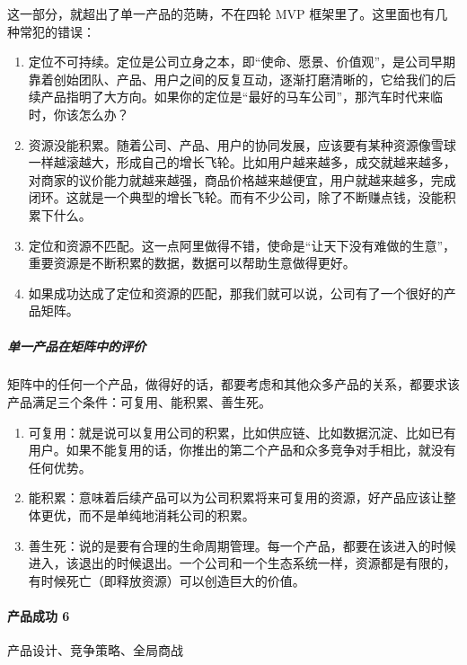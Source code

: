 \documentclass[letterpaper,11pt,english]{sphinxmanual}
\begin{document}
这一部分，就超出了单一产品的范畴，不在四轮 MVP
框架里了。这里面也有几种常犯的错误：
\begin{enumerate}
%
\item {} 
定位不可持续。定位是公司立身之本，即“使命、愿景、价值观”，是公司早期靠着创始团队、产品、用户之间的反复互动，逐渐打磨清晰的，它给我们的后续产品指明了大方向。如果你的定位是“最好的马车公司”，那汽车时代来临时，你该怎么办？

\item {} 
资源没能积累。随着公司、产品、用户的协同发展，应该要有某种资源像雪球一样越滚越大，形成自己的增长飞轮。比如用户越来越多，成交就越来越多，对商家的议价能力就越来越强，商品价格越来越便宜，用户就越来越多，完成闭环。这就是一个典型的增长飞轮。而有不少公司，除了不断赚点钱，没能积累下什么。

\item {} 
定位和资源不匹配。这一点阿里做得不错，使命是“让天下没有难做的生意”，重要资源是不断积累的数据，数据可以帮助生意做得更好。

\item {} 
如果成功达成了定位和资源的匹配，那我们就可以说，公司有了一个很好的产品矩阵。

\end{enumerate}


\subparagraph{单一产品在矩阵中的评价}
\label{\detokenize{chapter_introduction/Product:id42}}
矩阵中的任何一个产品，做得好的话，都要考虑和其他众多产品的关系，都要求该产品满足三个条件：可复用、能积累、善生死。
\begin{enumerate}
%
\item {} 
可复用：就是说可以复用公司的积累，比如供应链、比如数据沉淀、比如已有用户。如果不能复用的话，你推出的第二个产品和众多竞争对手相比，就没有任何优势。

\item {} 
能积累：意味着后续产品可以为公司积累将来可复用的资源，好产品应该让整体更优，而不是单纯地消耗公司的积累。

\item {} 
善生死：说的是要有合理的生命周期管理。每一个产品，都要在该进入的时候进入，该退出的时候退出。一个公司和一个生态系统一样，资源都是有限的，有时候死亡（即释放资源）可以创造巨大的价值。

\end{enumerate}


\paragraph{产品成功 6\sphinxfootnotemark[27]}
\label{\detokenize{chapter_introduction/Product:id43}}%
\begin{footnotetext}[27]\sphinxAtStartFootnote
{}
%
\end{footnotetext}\ignorespaces 
产品设计、竞争策略、全局商战
\end{document}
